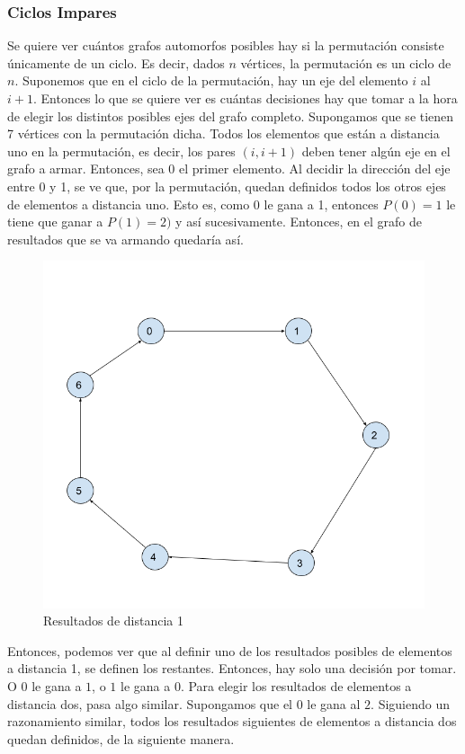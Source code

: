 \subsubsection{Ciclos Impares}

Se quiere ver cuántos grafos automorfos posibles hay si la permutación consiste únicamente de un ciclo. Es decir, dados $n$ vértices, la permutación es un ciclo de $n$. Suponemos que en el ciclo de la permutación, hay un eje del elemento $i$ al $i+1$. Entonces lo que se quiere ver es cuántas decisiones hay que tomar a la hora de elegir los distintos posibles ejes del grafo completo. Supongamos que se tienen 7 vértices con la permutación dicha. Todos los elementos que están a distancia uno en la permutación, es decir, los pares $(i,i+1)$ deben tener algún eje en el grafo a armar. Entonces, sea 0 el primer elemento. Al decidir la dirección del eje entre 0 y 1, se ve que, por la permutación, quedan definidos todos los otros ejes de elementos a distancia uno. Esto es, como 0 le gana a 1, entonces $P(0)=1$ le tiene que ganar a $P(1)=2)$ y así sucesivamente. Entonces, en el grafo de resultados que se va armando quedaría así.

\begin{figure}[H]
\centering
\includegraphics[width=14cm]{Imagenes/Ej4a.png}
\caption{Resultados de distancia 1}
\end{figure}

Entonces, podemos ver que al definir uno de los resultados posibles de elementos a distancia 1, se definen los restantes. Entonces, hay solo una decisión por tomar. O $0$ le gana a $1$, o $1$ le gana a $0$. Para elegir los resultados de elementos a distancia dos, pasa algo similar. Supongamos que el $0$ le gana al $2$. Siguiendo un razonamiento similar, todos los resultados siguientes de elementos a distancia dos quedan definidos, de la siguiente manera.

